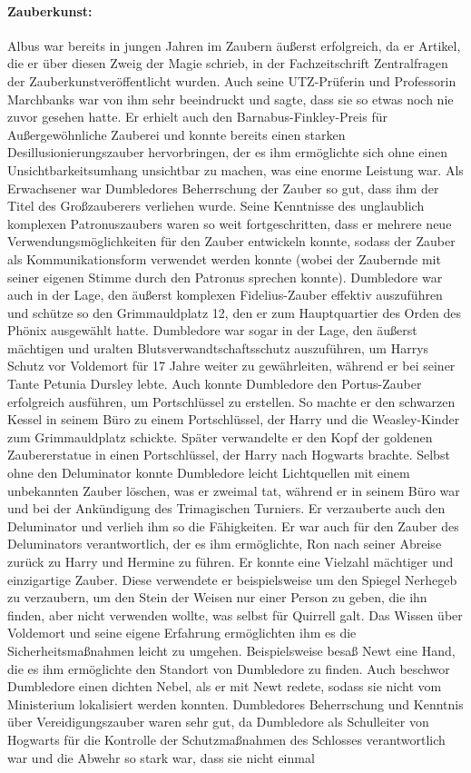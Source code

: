 \documentclass[a4paper, 10pt]{article}
\begin{document}
\paragraph{Zauberkunst:}
Albus war bereits in jungen Jahren im Zaubern äußerst erfolgreich, da er Artikel, die er über diesen Zweig der Magie schrieb, in der Fachzeitschrift Zentralfragen der Zauberkunstveröffentlicht wurden. Auch seine UTZ-Prüferin und Professorin Marchbanks war von ihm sehr beeindruckt und sagte, dass sie so etwas noch nie zuvor gesehen hatte. Er erhielt
auch den Barnabus-Finkley-Preis für Außergewöhnliche Zauberei und konnte bereits einen starken Desillusionierungszauber hervorbringen, der es ihm ermöglichte sich ohne einen Unsichtbarkeitsumhang unsichtbar zu machen, was eine enorme Leistung war. Als Erwachsener war Dumbledores Beherrschung der Zauber so gut, dass ihm der Titel des Großzauberers verliehen wurde. Seine Kenntnisse des unglaublich komplexen Patronuszaubers waren so weit fortgeschritten, dass er mehrere neue Verwendungsmöglichkeiten für den Zauber entwickeln konnte, sodass der Zauber als Kommunikationsform verwendet werden konnte (wobei der Zaubernde mit seiner eigenen Stimme durch den Patronus sprechen konnte). Dumbledore war auch in der Lage, den äußerst komplexen Fidelius-Zauber effektiv auszuführen und schütze so den Grimmauldplatz 12, den er zum Hauptquartier des Orden des Phönix ausgewählt hatte. Dumbledore war sogar in der Lage, den äußerst mächtigen und uralten Blutsverwandtschaftsschutz auszuführen, um Harrys Schutz vor Voldemort für 17 Jahre weiter zu gewährleiten, während er bei seiner Tante Petunia Dursley lebte. Auch konnte Dumbledore den Portus-Zauber erfolgreich ausführen, um Portschlüssel zu erstellen. So machte er den schwarzen Kessel in seinem Büro zu einem Portschlüssel, der Harry und die Weasley-Kinder zum Grimmauldplatz schickte. Später verwandelte er den Kopf der goldenen Zaubererstatue in einen Portschlüssel, der Harry nach Hogwarts brachte. Selbst ohne den Deluminator konnte Dumbledore leicht Lichtquellen mit einem unbekannten Zauber löschen, was er zweimal tat, während er in seinem Büro war und bei der Ankündigung des Trimagischen Turniers. Er verzauberte auch den Deluminator und verlieh ihm so die Fähigkeiten. Er war auch für den Zauber des Deluminators verantwortlich, der es ihm ermöglichte, Ron nach seiner Abreise zurück zu Harry und Hermine zu führen. Er konnte eine Vielzahl mächtiger und einzigartige Zauber. Diese verwendete er beispielsweise um den Spiegel Nerhegeb zu verzaubern, um den Stein der Weisen nur einer Person zu geben, die ihn finden, aber nicht verwenden wollte, was selbst für Quirrell galt. Das Wissen über Voldemort und seine eigene Erfahrung ermöglichten ihm es die Sicherheitsmaßnahmen leicht zu umgehen. Beispielsweise besaß Newt eine Hand, die es ihm ermöglichte den Standort von Dumbledore zu finden. Auch beschwor Dumbledore einen dichten Nebel, als er mit Newt redete, sodass sie nicht vom Ministerium lokalisiert werden konnten. Dumbledores Beherrschung und Kenntnis über Vereidigungszauber waren sehr gut, da Dumbledore als Schulleiter von Hogwarts für die Kontrolle der Schutzmaßnahmen des Schlosses verantwortlich war und die Abwehr so stark war, dass sie nicht einmal 
\end{document}
